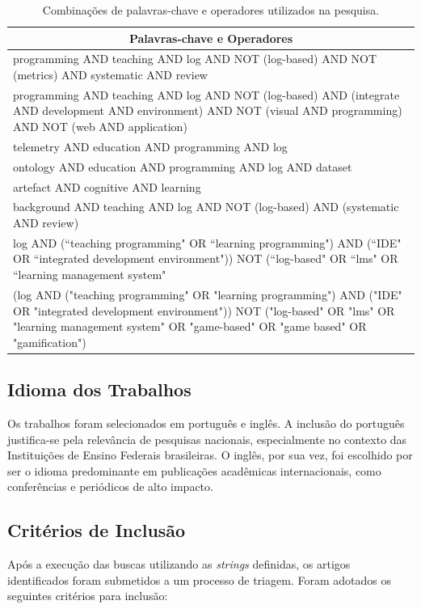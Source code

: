 \begin{table}[h!]
\centering
\footnotesize
\begin{tabular}{|p{16cm}|}
\hline 
\multicolumn{1}{|c|}{\textbf{Palavras-chave e Operadores}} \\ 
\hline 
programming AND teaching AND log AND NOT (log-based) AND NOT (metrics) AND systematic AND review \\ 
\hline 
programming AND teaching AND log AND NOT (log-based) AND (integrate AND development AND environment) AND NOT (visual AND programming) AND NOT (web AND application) \\ 
\hline 
telemetry AND education AND programming AND log \\ 
\hline 
ontology AND education AND programming AND log AND dataset \\
\hline
artefact AND cognitive AND learning \\
\hline
background AND teaching AND log AND NOT (log-based) AND (systematic AND review) \\
\hline
log AND (``teaching programming" OR ``learning programming") AND (``IDE" OR ``integrated development environment")) NOT (``log-based" OR ``lms" OR ``learning management system" \\ 
\hline
(log AND ("teaching programming" OR "learning programming") AND ("IDE" OR "integrated development environment")) NOT ("log-based" OR "lms" OR "learning management system" OR "game-based" OR "game based" OR "gamification") \\ 
\hline
\end{tabular}
\caption{Combinações de palavras-chave e operadores utilizados na pesquisa.}
\label{tab:keywords}
\end{table}

\subsection{Idioma dos Trabalhos}\label{sub:idioma-trabalhos}
Os trabalhos foram selecionados em português e inglês. A inclusão do português justifica-se pela relevância de pesquisas nacionais, especialmente no contexto das Instituições de Ensino Federais brasileiras. O inglês, por sua vez, foi escolhido por ser o idioma predominante em publicações acadêmicas internacionais, como conferências e periódicos de alto impacto.

\subsection{Critérios de Inclusão}\label{sub:criterios-inclusao}
\label{inclusion-critery}
Após a execução das buscas utilizando as \textit{strings} definidas, os artigos identificados foram submetidos a um processo de triagem. Foram adotados os seguintes critérios para inclusão:

